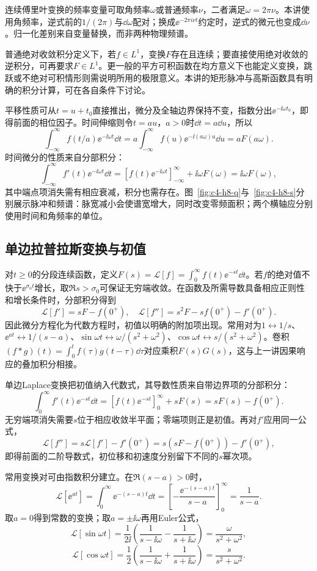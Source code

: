 连续傅里叶变换的频率变量可取角频率$\omega$或普通频率$\nu$，二者满足$\omega=2\pi\nu$。本讲使用角频率，逆式前的$1/(2\pi)$与$\dd\omega$配对；换成$\ee^{-2\pi i\nu t}$约定时，逆式的微元也变成$\dd\nu$。归一化差别来自变量替换，而非两种物理频谱。

普通绝对收敛积分定义下，若$f\in L^1$，变换$F$存在且连续；要直接使用绝对收敛的逆积分，可再要求$F\in L^1$。更一般的平方可积函数在均方意义下也能定义变换，跳跃或不绝对可积情形则需说明所用的极限意义。本讲的矩形脉冲与高斯函数具有明确的积分计算，可在各自条件下讨论。

平移性质可从$t=u+t_0$直接推出，微分及全轴边界保持不变，指数分出$\ee^{-\ii\omega t_0}$，即得前面的相位因子。时间伸缩则令$t=au$，$a>0$时$\dd t=a\dd u$，所以
\[\int_{-\infty}^{\infty}f(t/a)\ee^{-\ii\omega t}\dd t
=a\int_{-\infty}^{\infty}f(u)\ee^{-\ii(a\omega)u}\dd u=aF(a\omega).\]
时间微分的性质来自分部积分：
\[\int_{-\infty}^{\infty}f'(t)\ee^{-\ii\omega t}\dd t
=[f(t)\ee^{-\ii\omega t}]_{-\infty}^{\infty}
+\ii\omega F(\omega)=\ii\omega F(\omega),\]
其中端点项消失需有相应衰减，积分也需存在。图~\ref{fig:c4-h8-q}与~\ref{fig:c4-h8-s}分别展示脉冲和频谱：脉宽减小会使谱宽增大，同时改变零频面积；两个横轴应分别使用时间和角频率的单位。

\subsection{单边拉普拉斯变换与初值}
对$t\ge0$的分段连续函数，定义$F(s)=\mathcal L[f]=\int_0^\infty f(t)\ee^{-st}\dd t$。若$f$的绝对值不快于$\ee^{\sigma_0t}$增长，取$\Re s>\sigma_0$可保证无穷端收敛。在函数及所需导数具备相应正则性和增长条件时，分部积分得到
\[\mathcal L[f']=sF-f(0^+),\quad
\mathcal L[f'']=s^2F-sf(0^+)-f'(0^+).
\]
因此微分方程化为代数方程时，初值以明确的附加项出现。常用对为$1\leftrightarrow1/s$、$\ee^{at}\leftrightarrow1/(s-a)$、$\sin\omega t\leftrightarrow\omega/(s^2+\omega^2)$、$\cos\omega t\leftrightarrow s/(s^2+\omega^2)$。卷积$(f*g)(t)=\int_0^tf(\tau)g(t-\tau)\dd\tau$对应乘积$F(s)G(s)$，这与上一讲因果响应的叠加积分相接。

单边Laplace变换把初值纳入代数式，其导数性质来自带边界项的分部积分：
\[\int_0^\infty f'(t)\ee^{-st}\dd t
=[f(t)\ee^{-st}]_0^\infty+sF(s)=sF(s)-f(0^+).\]
无穷端项消失需要$s$位于相应收敛半平面；零端项则正是初值。再对$f'$应用同一公式，
\[\mathcal L[f'']=s\mathcal L[f']-f'(0^+)
=s(sF-f(0^+))-f'(0^+),\]
即得前面的二阶导数式，初位移和初速度分别留下不同的$s$幂次项。

常用变换对可由指数积分建立。在$\Re(s-a)>0$时，
\[\mathcal L[\ee^{at}]=\int_0^\infty\ee^{-(s-a)t}\dd t
=\left[-\frac{\ee^{-(s-a)t}}{s-a}\right]_0^\infty=\frac1{s-a}.\]
取$a=0$得到常数的变换；取$a=\pm\ii\omega$再用Euler公式，
\[\mathcal L[\sin\omega t]=\frac1{2\ii}
\left(\frac1{s-\ii\omega}-\frac1{s+\ii\omega}\right)
=\frac\omega{s^2+\omega^2},\]
\[\mathcal L[\cos\omega t]=\frac12
\left(\frac1{s-\ii\omega}+\frac1{s+\ii\omega}\right)
=\frac s{s^2+\omega^2}.\]

